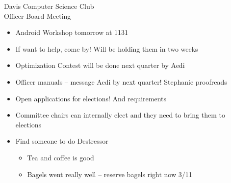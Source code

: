 \documentclass{article}
\begin{document}
\begin{Minutes}{Davis Computer Science Club\\Officer Board Meeting}
\begin {itemize}
    \item Android Workshop tomorrow at 1131
    \item If want to help, come by! Will be holding them in two weeks
    \item Optimization Contest will be done next quarter by Aedi
    \item Officer manuals -- message Aedi by next quarter! Stephanie proofreads
    \item Open applications for elections! And requirements 
    \item Committee chairs can internally elect and they need to bring them to elections
    \item Find someone to do Destressor
    \begin {itemize}
        \item Tea and coffee is good
        \item Bagels went really well -- reserve bagels right now 3/11
    \end {itemize}
\end {itemize}

\end{Minutes}
\thispagestyle{creditfooter}
\end{document}
